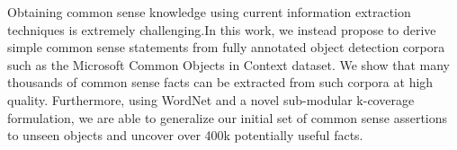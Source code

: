 Obtaining common sense knowledge using current information extraction techniques is extremely challenging.In this work, we instead propose to derive simple common sense statements from fully annotated object detection corpora such as the Microsoft Common Objects in Context dataset. We show that many thousands of common sense facts can be extracted from such corpora at high quality. Furthermore, using WordNet and a novel sub-modular k-coverage formulation, we are able to generalize our initial set of common sense assertions to unseen objects and uncover over 400k potentially useful facts.
